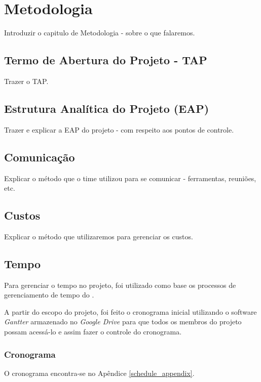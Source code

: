 \chapter{Metodologia}

Introduzir o capitulo de Metodologia - sobre o que falaremos.

\section{Termo de Abertura do Projeto - TAP}

Trazer o TAP.

\section{Estrutura Analítica do Projeto (EAP)}

Trazer e explicar a EAP do projeto - com respeito aos pontos de controle.

\section{Comunicação}

Explicar o método que o time utilizou para se comunicar - ferramentas, reuniões, etc.

\section{Custos}

Explicar o método que utilizaremos para gerenciar os custos.

\section{Tempo}

Para gerenciar o tempo no projeto, foi utilizado como base os processos
de gerenciamento de tempo do \cite{pmbok2012}.

A partir do escopo do projeto, foi feito o cronograma inicial utilizando o software \textit{Gantter} armazenado no \textit{Google Drive} para que todos os membros do projeto
possam acessá-lo e assim fazer o controle do cronograma.

\subsection{Cronograma}

O cronograma encontra-se no Apêndice \ref{schedule_appendix}.

